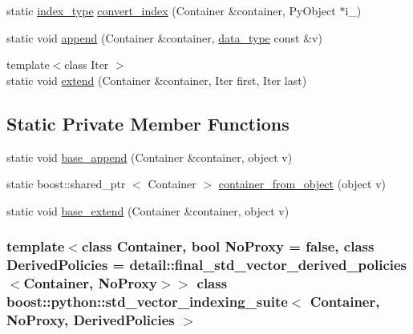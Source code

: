 \begin{DoxyCompactItemize}
\item 
static \hyperlink{classboost_1_1python_1_1std__vector__indexing__suite_a3124827b535a08798fbd33b9fee7b668}{index\-\_\-type} \hyperlink{classboost_1_1python_1_1std__vector__indexing__suite_ae4228941b0d743b8cfd1362fe95a1795}{convert\-\_\-index} (\-Container \&container, \-Py\-Object $\ast$i\-\_\-)
\item 
static void \hyperlink{classboost_1_1python_1_1std__vector__indexing__suite_a317a62cce09e40822e7c376cd6afc7b4}{append} (\-Container \&container, \hyperlink{classboost_1_1python_1_1std__vector__indexing__suite_a9c3db9df25d6966c54154275377c94ce}{data\-\_\-type} const \&v)
\item 
{\footnotesize template$<$class Iter $>$ }\\static void \hyperlink{classboost_1_1python_1_1std__vector__indexing__suite_a1e7c971129b8f99b579fbe311ce378d6}{extend} (\-Container \&container, \-Iter first, \-Iter last)
\end{DoxyCompactItemize}
\subsection*{\-Static \-Private \-Member \-Functions}
\begin{DoxyCompactItemize}
\item 
static void \hyperlink{classboost_1_1python_1_1std__vector__indexing__suite_a0857a3ee7c2b30c2d4b3452c8d16665e}{base\-\_\-append} (\-Container \&container, object v)
\item 
static boost\-::shared\-\_\-ptr\*
$<$ \-Container $>$ \hyperlink{classboost_1_1python_1_1std__vector__indexing__suite_a1860d96ad96a74166d03d433826a5249}{container\-\_\-from\-\_\-object} (object v)
\item 
static void \hyperlink{classboost_1_1python_1_1std__vector__indexing__suite_acac3b93b150b5101da9b16e961ea4f09}{base\-\_\-extend} (\-Container \&container, object v)
\end{DoxyCompactItemize}
\subsubsection*{template$<$class \-Container, bool \-No\-Proxy = false, class \-Derived\-Policies = detail\-::final\-\_\-std\-\_\-vector\-\_\-derived\-\_\-policies$<$\-Container, No\-Proxy$>$$>$ class boost\-::python\-::std\-\_\-vector\-\_\-indexing\-\_\-suite$<$ Container, No\-Proxy, Derived\-Policies $>$}



